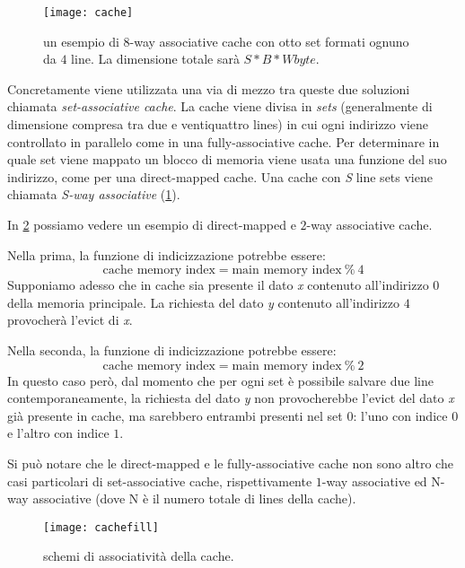 				\begin{figure}
					\begin{center}
						\texttt{[image: cache]}
						\caption[$8$-way associative cache]{un esempio di $8$-way associative cache con otto set formati ognuno da $4$ line. La dimensione totale sarà $S*B*W byte$.}
						\label{fig:cache}
					\end{center}
				\end{figure}
				
				Concretamente viene utilizzata una via di mezzo tra queste due soluzioni chiamata \emph{set-associative cache}. La cache viene divisa in \emph{sets} (generalmente di dimensione compresa tra due e ventiquattro lines) in cui ogni indirizzo viene controllato in parallelo come in una fully-associative cache. Per determinare in quale set viene mappato un blocco di memoria viene usata una funzione del suo indirizzo, come per una direct-mapped cache. Una cache con \emph{S} line sets viene chiamata \emph{S-way associative} (\cref{fig:cache}). 
				
				In \cref{fig:cachefill} possiamo vedere un esempio di direct-mapped e $2$-way associative cache. 
				
				Nella prima, la funzione di indicizzazione potrebbe essere: $$\text{cache memory index} = \text{main memory index}\ \% \ 4$$ Supponiamo adesso che in cache sia presente il dato \emph{x} contenuto all'indirizzo $0$ della memoria principale. La richiesta del dato \emph{y} contenuto all'indirizzo $4$ provocherà l'evict di \emph{x}.
				
				Nella seconda, la funzione di indicizzazione potrebbe essere: $$\text{cache memory index} = \text{main memory index}\ \% \ 2$$ In questo caso però, dal momento che per ogni set è possibile salvare due line contemporaneamente, la richiesta del dato \emph{y} non provocherebbe l'evict del dato \emph{x} già presente in cache, ma sarebbero entrambi presenti nel set $0$: l'uno con indice $0$ e l'altro con indice $1$.
				
				Si può notare che le direct-mapped e le fully-associative cache non sono altro che casi particolari di set-associative cache, rispettivamente $1$-way associative ed N-way associative (dove N è il numero totale di lines della cache).
				
				\begin{figure}
					\begin{center}
						\texttt{[image: cachefill]}
						\caption{schemi di associatività della cache.}
						\label{fig:cachefill}
					\end{center}
				\end{figure}
				
